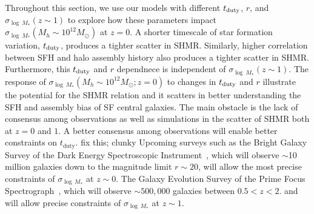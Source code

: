 \documentclass[12pt, letterpaper, preprint, tighten]{aastex62}
\newcommand{\ch}[1]{{\color{orange}{\bf CH:} #1}}
\newcommand{\edt}[1]{{\color{dred}{\bf} #1}}
\newcommand{\tduty}{t_{\rm duty}}
\newcommand{\logsfr}{\log\mathrm{SFR}}
\begin{document}
\edt{
    Throughout this section, we use our models with different $\tduty$, $r$, and
$\sigma_{\log~M_*}(z\sim1)$ to explore how these parameters impact
$\sigma_{\log~M_*}(M_h\sim10^{12}M_\odot)$ at $z=0$. A shorter timescale of
star formation variation, $\tduty$, produces a tighter scatter in SHMR. Similarly,
higher correlation between SFH and halo assembly history also produces a tighter
scatter in SHMR. Furthermore, this $\tduty$ and $r$ dependnece is independent of
$\sigma_{\log~M_*}(z\sim1)$. The response of $\sigma_{\log~M_*}(M_h\sim10^{12}M_\odot; z=0)$
to changes in $\tduty$ and $r$ illustrate the potential for the SHMR relation
and it scatters in better understanding the SFH and assembly bias of SF central
galaxies. The main obstacle is the lack of consensus among observations as well
as simulations in the scatter of SHMR both at $z=0$ and $1$.
A better consensus among observations will enable better constraints
on $t_\mathrm{duty}$. \ch{fix this; clunky} 
Upcoming surveys such as the Bright Galaxy Survey of the Dark
Energy Spectroscopic Instrument~\citep[DESI;][]{desicollaboration2016}, which will
observe $\sim$10 million galaxies down to the magnitude limit $r \sim 20$, will
allow the most precise constraints of $\sigma_{\log\,M_*}$ at $z\sim0$. The Galaxy
Evolution Survey of the Prime Focus Spectrograph~\citep{takada2014,tamura2016}, 
which will observe $\sim500,000$ galaxies between $0.5 < z < 2.$ and will allow
precise constraints of $\sigma_{\log\,M_*}$ at $z\sim1$.
}
\end{document}
